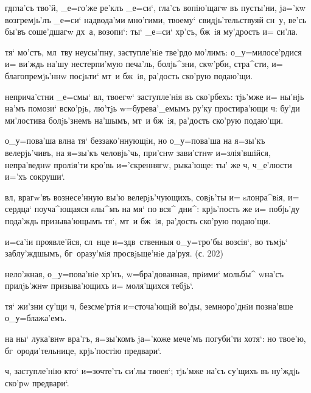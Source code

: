 
  гд гла'съ тво'й, 
_е=го'же ре'клъ _е=си`, гла'съ вопiю'щагw въ пусты'ни, 
jа='кw возгремjь'лъ _е=си` над\ъ вода'ми мно'гими, 
твоему` свидjь'тельствуяй сн~у, ве'сь бы'въ соше'дшагw 
дх~а, возопи`: ты` _е=си` хр'съ, бж~iя му'дрость и= 
си'ла.

 тя` мо'стъ, мл~тву неусы'пну, 
заступле'нiе тве'рдо мо'лимъ: о_у=милосе'рдися и= ви'ждь 
на'шу нестерпи'мую печа'ль, болjь^зни, скw'рби, стра^сти, 
и= благопремjь'ннw посjьти` мт~и бж~iя, ра'дость ско'рую 
подаю'щи.

 неприча'стни _е=смы` вл, твоегw` 
заступле'нiя въ ско'рбехъ: тjь'мже и= ны'нjь на'мъ 
помози` вско'рjь, лю'тjь w=бурева'_емымъ ру'ку 
простира'ющи ч: бу'ди ми'лостива болjь'знемъ 
на'шымъ, мт~и бж~iя, ра'дость ско'рую подаю'щи.

  о_у=пова'ша вл на тя` 
беззако'ннующiи, но о_у=пова'ша на я=зы'къ велерjь'чивъ, 
на я=зы'къ человjь'чь, при'снw зави'стнw и=злiя'вшiйся, 
непра'веднw пролiя'ти кро'вь и='скреннягw, рыка'юще: ты' 
же ч, ч_е'люсти и='хъ сокруши`.

   вл, врагw'въ вознесе'нную 
вы'ю велерjь'чующихъ, совjь'ты и= sлонра^вiя, и= сердца` 
поуча^ющаяся sлы^мъ на мя` по вся^ дни^: крjь'пость же и= 
побjь'ду пода'ждь призыва'ющымъ тя`, мт~и бж~iя, ра'дость 
ско'рую подаю'щи.


  и=са'iи проявле'йся, сл~нце 
и=з\ъ дв~ственныя о_у=тро'бы возсiя`, во тьмjь` 
заблу'ждшымъ, бг~оразу'мiя просвjьще'нiе да'руя. (с. 202)

 нело'жная, о_у=пова'нiе хр'нъ, 
w=бра'дованная, прiими` мольбы^ w\т на'съ прилjь'жнw 
призыва'ющихъ и= моля'щихся тебjь`.

 тя` жи'зни су'щи ч, безсме'ртiя 
и=сточа'ющiй во'ды, земноро'днiи позна'вше о_у=блажа'емъ.

  на ны` лука'внw вра'гъ, 
я=зы'комъ jа='коже мече'мъ погуби'ти хотя`: но твое'ю, 
бг~ороди'тельнице, крjь'постiю предвари`.

   ч, заступле'нiю кто` 
и=зочте'тъ си'лы твоея`; тjь'мже на'съ су'щихъ въ ну'ждjь 
ско'рw предвари`.

